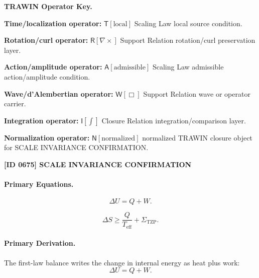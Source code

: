 \par\vspace{0.45\baselineskip}
\noindent\begin{minipage}[t]{\linewidth}
\begingroup
\small
\raggedright
\textbf{TRAWIN Operator Key.}\par
\noindent\textbf{Time/localization operator:} $\mathsf{T}\!\left[\mathrm{local}\right]$ Scaling Law local source condition.\par
\noindent\textbf{Rotation/curl operator:} $\mathsf{R}\!\left[\nabla\times\right]$ Support Relation rotation/curl preservation layer.\par
\noindent\textbf{Action/amplitude operator:} $\mathsf{A}\!\left[\mathrm{admissible}\right]$ Scaling Law admissible action/amplitude condition.\par
\noindent\textbf{Wave/d'Alembertian operator:} $\mathsf{W}\!\left[\Box\right]$ Support Relation wave or operator carrier.\par
\noindent\textbf{Integration operator:} $\mathsf{I}\!\left[\int\right]$ Closure Relation integration/comparison layer.\par
\noindent\textbf{Normalization operator:} $\mathsf{N}\!\left[\mathrm{normalized}\right]$ normalized TRAWIN closure object for SCALE INVARIANCE CONFIRMATION.\par
\endgroup
\end{minipage}

\clearpage
\noindent\textbf{[ID 0675] SCALE INVARIANCE CONFIRMATION}\par
\vspace{0.35em}
\paragraph{Primary Equations.}
\begin{equation}
\Delta U = Q+W .
\end{equation}

\begin{equation}
\Delta S
\geq
\frac{Q}{T_{\mathrm{eff}}}
+
\Sigma_{\mathrm{TZP}} .
\end{equation}

\paragraph{Primary Derivation.}
The first-law balance writes the change in internal energy as heat plus work:
\begin{equation}
\Delta U=Q+W .
\end{equation}

